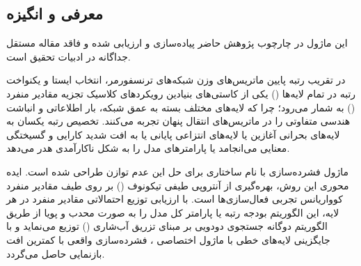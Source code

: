 \subsection{معرفی و انگیزه}
این ماژول در چارچوب پژوهش حاضر پیاده‌سازی و ارزیابی شده و فاقد مقاله مستقل جداگانه در ادبیات تحقیق است.

در تقریب رتبه پایین ماتریس‌های وزن شبکه‌های ترنسفورمر، انتخاب ایستا و یکنواخت رتبه در تمام لایه‌ها () یکی از کاستی‌های بنیادین رویکردهای کلاسیک تجزیه مقادیر منفرد () به شمار می‌رود؛ چرا که لایه‌های مختلف بسته به عمق شبکه، بار اطلاعاتی و انباشت هندسی متفاوتی را در ماتریس‌های انتقال پنهان تجربه می‌کنند. تخصیص رتبه یکسان به لایه‌های بحرانی آغازین یا لایه‌های انتزاعی پایانی یا به افت شدید کارایی و گسیختگی معنایی می‌انجامد یا پارامترهای مدل را به شکل ناکارآمدی هدر می‌دهد.

ماژول فشرده‌سازی  با نام ساختاری  برای حل این عدم توازن طراحی شده است. ایده محوری این روش، بهره‌گیری از آنتروپی طیفی تیکونوف () بر روی طیف مقادیر منفرد کوواریانس تجربی فعال‌سازی‌ها است. با ارزیابی توزیع احتمالاتی مقادیر منفرد در هر لایه، این الگوریتم بودجه رتبه یا پارامتر کل مدل را به صورت محدب و پویا از طریق الگوریتم دوگانه جستجوی دودویی بر مبنای تزریق آب‌شاری () توزیع می‌نماید و با جایگزینی لایه‌های خطی با ماژول اختصاصی ، فشرده‌سازی واقعی با کمترین افت بازنمایی حاصل می‌گردد.
